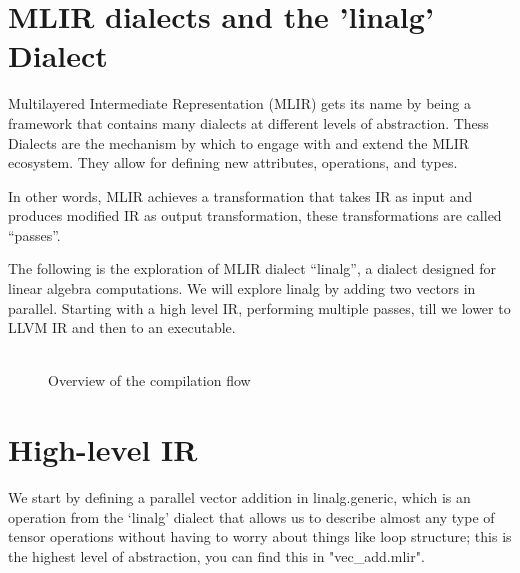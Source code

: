 \section*{MLIR dialects and the 'linalg' Dialect}
Multilayered Intermediate Representation (MLIR) gets its name by being a framework that contains many dialects at different levels of abstraction. Thess Dialects are the mechanism by which to engage with and extend the MLIR ecosystem. They allow for defining new attributes, operations, and types. 

In other words, MLIR achieves a transformation that takes IR as input and produces modified IR as output transformation, these transformations are called “passes”.

The following is the exploration of MLIR dialect “linalg”, a dialect designed for linear algebra computations. We will explore linalg by adding two vectors in parallel. Starting with a high level IR, performing multiple passes, till we lower to LLVM IR and then to an executable.
\\
\\
\begin{figure}[H]
\centering
{}
\caption{Overview of the compilation flow}
\end{figure}

\section*{High-level IR}
We start by defining a parallel vector addition in linalg.generic, which is an operation from the ‘linalg’ dialect that allows us to describe almost any type of tensor operations without having to worry about things like loop structure; this is the highest level of abstraction, you can find this in "vec\_add.mlir".

